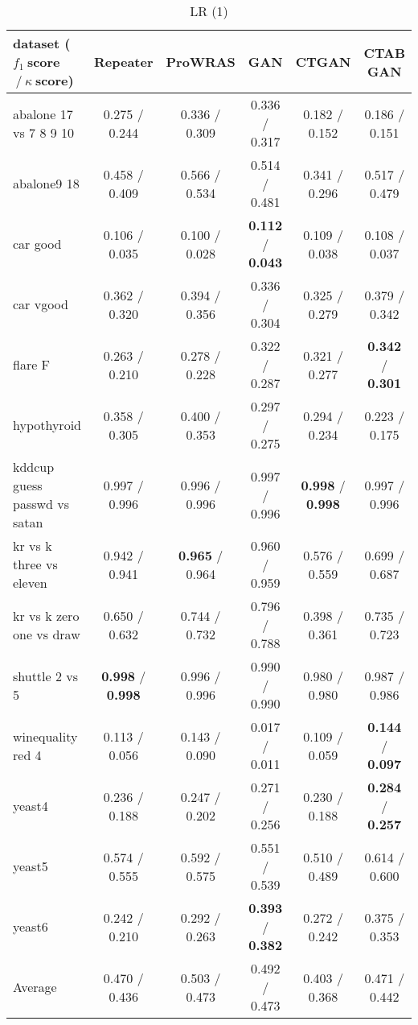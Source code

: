 

\begin{table*}[ht]\scriptsize\caption{LR (1)}\label{tab:results:LR:A}\centering\tabularnewline
\begin{tabular}{l|@{\hskip3pt}c@{\hskip3pt}|@{\hskip3pt}c@{\hskip3pt}|@{\hskip3pt}c@{\hskip3pt}|@{\hskip3pt}c@{\hskip3pt}|@{\hskip3pt}c@{\hskip3pt}}\hline
\textbf{dataset ($f_1~$score$~/~\kappa~$score)} & \textbf{Repeater} & \textbf{ProWRAS} & \textbf{GAN} & \textbf{CTGAN} & \textbf{CTAB GAN}
\tabularnewline
\hline
abalone 17 vs 7 8 9 10 &  0.275  /  0.244  &  0.336  /  0.309  &  0.336  /  0.317  &  0.182  /  0.152  &  0.186  /  0.151 
\tabularnewline
abalone9 18 &  0.458  /  0.409  &  0.566  /  0.534  &  0.514  /  0.481  &  0.341  /  0.296  &  0.517  /  0.479 
\tabularnewline
car good &  0.106  /  0.035  &  0.100  /  0.028  &  \textbf{0.112}  /  \textbf{0.043}  &  0.109  /  0.038  &  0.108  /  0.037 
\tabularnewline
car vgood &  0.362  /  0.320  &  0.394  /  0.356  &  0.336  /  0.304  &  0.325  /  0.279  &  0.379  /  0.342 
\tabularnewline
flare F &  0.263  /  0.210  &  0.278  /  0.228  &  0.322  /  0.287  &  0.321  /  0.277  &  \textbf{0.342}  /  \textbf{0.301} 
\tabularnewline
hypothyroid &  0.358  /  0.305  &  0.400  /  0.353  &  0.297  /  0.275  &  0.294  /  0.234  &  0.223  /  0.175 
\tabularnewline
kddcup guess passwd vs satan &  0.997  /  0.996  &  0.996  /  0.996  &  0.997  /  0.996  &  \textbf{0.998}  /  \textbf{0.998}  &  0.997  /  0.996 
\tabularnewline
kr vs k three vs eleven &  0.942  /  0.941  &  \textbf{0.965}  /  0.964  &  0.960  /  0.959  &  0.576  /  0.559  &  0.699  /  0.687 
\tabularnewline
kr vs k zero one vs draw &  0.650  /  0.632  &  0.744  /  0.732  &  0.796  /  0.788  &  0.398  /  0.361  &  0.735  /  0.723 
\tabularnewline
shuttle 2 vs 5 &  \textbf{0.998}  /  \textbf{0.998}  &  0.996  /  0.996  &  0.990  /  0.990  &  0.980  /  0.980  &  0.987  /  0.986 
\tabularnewline
winequality red 4 &  0.113  /  0.056  &  0.143  /  0.090  &  0.017  /  0.011  &  0.109  /  0.059  &  \textbf{0.144}  /  \textbf{0.097} 
\tabularnewline
yeast4 &  0.236  /  0.188  &  0.247  /  0.202  &  0.271  /  0.256  &  0.230  /  0.188  &  \textbf{0.284}  /  \textbf{0.257} 
\tabularnewline
yeast5 &  0.574  /  0.555  &  0.592  /  0.575  &  0.551  /  0.539  &  0.510  /  0.489  &  0.614  /  0.600 
\tabularnewline
yeast6 &  0.242  /  0.210  &  0.292  /  0.263  &  \textbf{0.393}  /  \textbf{0.382}  &  0.272  /  0.242  &  0.375  /  0.353 
\tabularnewline
\hline Average &  0.470  /  0.436  &  0.503  /  0.473  &  0.492  /  0.473  &  0.403  /  0.368  &  0.471  /  0.442 
\tabularnewline
\hline\end{tabular}\end{table*}


